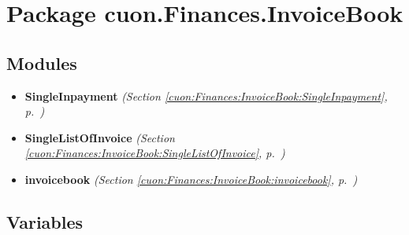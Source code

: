 %
%
%


\section{Package cuon.Finances.InvoiceBook}

    \label{cuon:Finances:InvoiceBook}


\subsection{Modules}

\begin{itemize}
\setlength{\parskip}{0ex}
\item \textbf{SingleInpayment}
  \textit{(Section \ref{cuon:Finances:InvoiceBook:SingleInpayment}, p.~\pageref{cuon:Finances:InvoiceBook:SingleInpayment})}

\item \textbf{SingleListOfInvoice}
  \textit{(Section \ref{cuon:Finances:InvoiceBook:SingleListOfInvoice}, p.~\pageref{cuon:Finances:InvoiceBook:SingleListOfInvoice})}

\item \textbf{invoicebook}
  \textit{(Section \ref{cuon:Finances:InvoiceBook:invoicebook}, p.~\pageref{cuon:Finances:InvoiceBook:invoicebook})}

\end{itemize}



  \subsection{Variables}

